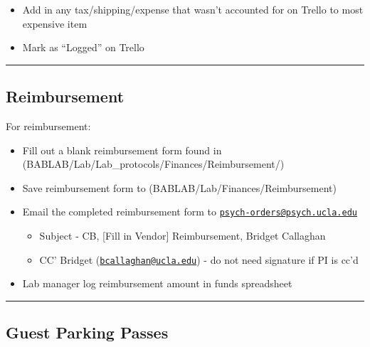 \documentclass[]{book}
\providecommand{\tightlist}{%
  \setlength{\itemsep}{0pt}\setlength{\parskip}{0pt}}
\begin{document}
\begin{itemize}
  \begin{itemize}
  \tightlist
  \item
    Add in any tax/shipping/expense that wasn't accounted for on Trello to most expensive item
  \item
    Mark as ``Logged'' on Trello
  \end{itemize}
\end{itemize}

\begin{center}\rule{0.5\linewidth}{\linethickness}\end{center}

\hypertarget{reimbursement}{%
\subsection{Reimbursement}\label{reimbursement}}

For reimbursement:

\begin{itemize}
\tightlist
\item
  Fill out a blank reimbursement form found in (BABLAB/Lab/Lab\_protocols/Finances/Reimbursement/)
\item
  Save reimbursement form to (BABLAB/Lab/Finances/Reimbursement)
\item
  Email the completed reimbursement form to \href{mailto:psych-orders@psych.ucla.edu}{\nolinkurl{psych-orders@psych.ucla.edu}}

  \begin{itemize}
  \tightlist
  \item
    Subject - CB, {[}Fill in Vendor{]} Reimbursement, Bridget Callaghan
  \item
    CC' Bridget (\href{mailto:bcallaghan@ucla.edu}{\nolinkurl{bcallaghan@ucla.edu}}) - do not need signature if PI is cc'd
  \end{itemize}
\item
  Lab manager log reimbursement amount in funds spreadsheet
\end{itemize}

\begin{center}\rule{0.5\linewidth}{\linethickness}\end{center}

\hypertarget{guest-parking-passes}{%
\subsection{Guest Parking Passes}\label{guest-parking-passes}}
\end{document}
